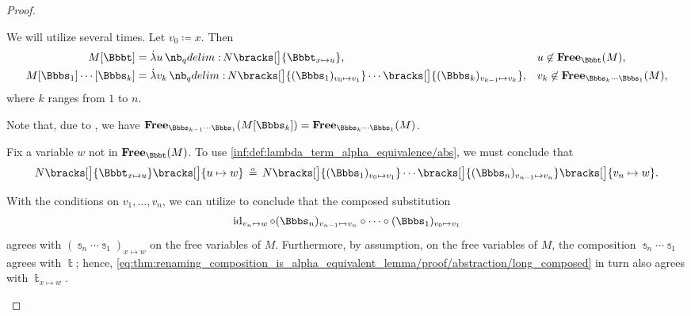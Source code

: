 \begin{proof}
\begin{itemize}
    We will utilize  several times. Let \( v_0 \coloneqq x \). Then
    \begin{align*}
      M[\Bbbt]                    &= \qabs u N\bracks[\big]{ \Bbbt_{x \mapsto u} },                                                                     &&u \not\in \op*{Free}_\Bbbt(M), \\
      M[\Bbbs_1] \cdots [\Bbbs_k] &= \qabs {v_k} N\bracks[\big]{ (\Bbbs_1)_{v_0 \mapsto v_1} } \cdots \bracks[\big]{ (\Bbbs_k)_{v_{k-1} \mapsto v_k} }, &&v_k \not\in \op*{Free}_{\Bbbs_k \cdots \Bbbs_1}(M),
    \end{align*}
    where \( k \) ranges from \( 1 \) to \( n \).

    Note that, due to , we have \( \op*{Free}_{\Bbbs_{k-1} \cdots \Bbbs_1}(M[\Bbbs_k]) = \op*{Free}_{\Bbbs_k \cdots \Bbbs_1}(M) \).

    Fix a variable \( w \) not in \( \op*{Free}_\Bbbt(M) \). To use \ref{inf:def:lambda_term_alpha_equivalence/abs}, we must conclude that
    \begin{equation}\label{eq:thm:renaming_composition_is_alpha_equivalent_lemma/proof/abstraction/goal}
      N\bracks[\big]{ \Bbbt_{x \mapsto u} }\bracks[\big]{ u \mapsto w } \aequiv N\bracks[\big]{ (\Bbbs_1)_{v_0 \mapsto v_1} } \cdots \bracks[\big]{ (\Bbbs_n)_{v_{n-1} \mapsto v_n} } \bracks[\big]{ v_n \mapsto w }.
    \end{equation}

    With the conditions on \( v_1, \ldots, v_n \), we can utilize  to conclude that the composed substitution
    \begin{equation}\label{eq:thm:renaming_composition_is_alpha_equivalent_lemma/proof/abstraction/long_composed}
      \id_{v_n \mapsto w} \bincirc (\Bbbs_n)_{v_{n-1} \mapsto v_n} \bincirc \cdots \bincirc (\Bbbs_1)_{v_0 \mapsto v_1}
    \end{equation}
    agrees with \( (\Bbbs_n \cdots \Bbbs_1)_{x \mapsto w} \) on the free variables of \( M \). Furthermore, by assumption, on the free variables of \( M \), the composition \( \Bbbs_n \cdots \Bbbs_1 \) agrees with \( \Bbbt \); hence, \eqref{eq:thm:renaming_composition_is_alpha_equivalent_lemma/proof/abstraction/long_composed} in turn also agrees with \( \Bbbt_{x \mapsto w} \).


\end{itemize}
\end{proof}
